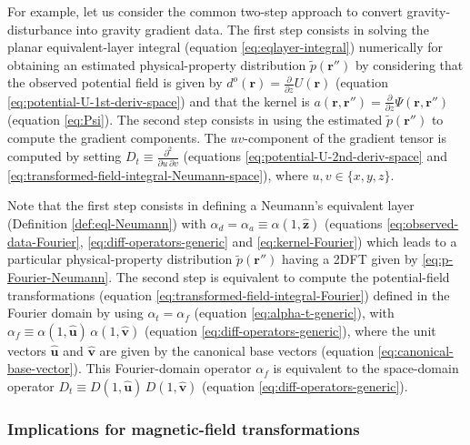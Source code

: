 For example, let us consider the common two-step approach to convert gravity-disturbance into gravity
gradient data. The first step consists in solving the planar equivalent-layer integral (equation \ref{eq:eqlayer-integral})
numerically for obtaining an estimated physical-property distribution $\tilde{p}(\mathbf{r}'')$ by considering that the
observed potential field is given by $d^{o}(\mathbf{r}) = \tfrac{\partial}{\partial z} U(\mathbf{r})$ (equation \ref{eq:potential-U-1st-deriv-space})
and that the kernel is $a(\mathbf{r}, \mathbf{r}'') = \tfrac{\partial}{\partial z} \Psi(\mathbf{r}, \mathbf{r}'')$ 
(equation \ref{eq:Psi}).
The second step consists in using the estimated $\tilde{p}(\mathbf{r}'')$ to compute the gradient components.
The $uv$-component of the gradient tensor is computed by setting $D_{t} \equiv \tfrac{\partial^{2}}{\partial u \, \partial v}$
(equations \ref{eq:potential-U-2nd-deriv-space} and \ref{eq:transformed-field-integral-Neumann-space}),
where $u, v \in \{ x, y, z \}$.

Note that the first step consists in defining a Neumann's equivalent layer (Definition \ref{def:eql-Neumann}) with 
$\alpha_{d} = \alpha_{a} \equiv \alpha(1, \hat{\mathbf{z}})$ 
(equations \ref{eq:observed-data-Fourier}, \ref{eq:diff-operators-generic} and \ref{eq:kernel-Fourier}) 
which leads to a particular physical-property distribution 
$\tilde{p}(\mathbf{r}'')$ having a 2DFT given by \ref{eq:p-Fourier-Neumann}. The second step is equivalent to 
compute the potential-field transformations (equation \ref{eq:transformed-field-integral-Fourier}) defined in the Fourier domain 
by using $\alpha_{t} = \alpha_{f}$ (equation \ref{eq:alpha-t-generic}), with 
$\alpha_{f} \equiv \alpha(1, \hat{\mathbf{u}}) \, \alpha(1, \hat{\mathbf{v}})$ (equation \ref{eq:diff-operators-generic}), 
where the unit vectors $\hat{\mathbf{u}}$ and $\hat{\mathbf{v}}$ are given by the canonical base vectors (equation \ref{eq:canonical-base-vector}).
This Fourier-domain operator $\alpha_{f}$ is equivalent to the space-domain operator $D_{t} \equiv D(1, \hat{\mathbf{u}}) \, D(1, \hat{\mathbf{v}})$
(equation \ref{eq:diff-operators-generic}).

\subsubsection{Implications for magnetic-field transformations}

